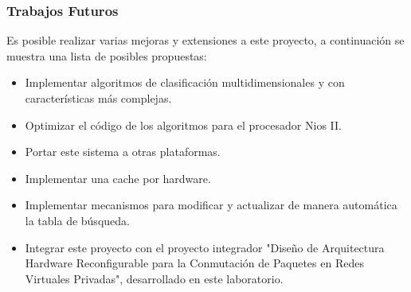 \subsubsection{Trabajos Futuros}

Es posible realizar varias mejoras y extensiones a este proyecto, a continuación se muestra una lista de posibles propuestas:

\begin{itemize}
	\item Implementar algoritmos de clasificación multidimensionales y con características más complejas.
	\item Optimizar el código de los algoritmos para el procesador Nios II. 
	\item Portar este sistema a otras plataformas.
	\item Implementar una cache por hardware.
	\item Implementar mecanismos para modificar y actualizar de manera automática la tabla de búsqueda.
	\item Integrar este proyecto con el proyecto integrador "Diseño de Arquitectura Hardware Reconfigurable para la Conmutación de Paquetes en Redes Virtuales Privadas"\cite{spaz}, desarrollado en este laboratorio.
\end{itemize}






